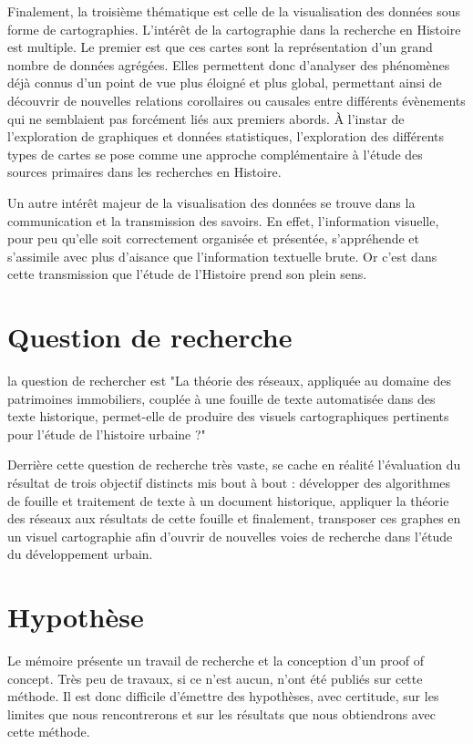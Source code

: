 Finalement, la troisième thématique est celle de la visualisation des données sous forme de cartographies. L’intérêt de la cartographie dans la recherche en Histoire est multiple. Le premier est que ces cartes sont la représentation d’un grand nombre de données agrégées. Elles permettent donc d’analyser des phénomènes déjà connus d’un point de vue plus éloigné et plus global, permettant ainsi de découvrir de nouvelles relations corollaires ou causales entre différents évènements qui ne semblaient pas forcément liés aux premiers abords. À l’instar de l’exploration de graphiques et données statistiques, l’exploration des différents types de cartes se pose comme une approche complémentaire à l’étude des sources primaires dans les recherches en Histoire.

Un autre intérêt majeur de la visualisation des données se trouve dans la communication et la transmission des savoirs. En effet, l’information visuelle, pour peu qu’elle soit correctement organisée et présentée, s’appréhende et s’assimile avec plus d’aisance que l’information textuelle brute. Or c’est dans cette transmission que l’étude de l’Histoire prend son plein sens.

\section{Question de recherche}
 la question de rechercher est "La théorie des réseaux, appliquée au domaine des patrimoines immobiliers, couplée à une fouille de texte automatisée dans des texte historique, permet-elle de produire des visuels cartographiques pertinents pour l’étude de l’histoire urbaine ?"
 
 Derrière cette question de recherche très vaste, se cache en réalité l'évaluation du résultat de trois objectif distincts mis bout à bout : développer des algorithmes de fouille et traitement de texte à un document historique, appliquer la théorie des réseaux aux résultats de cette fouille et finalement, transposer ces graphes en un visuel cartographie afin d'ouvrir de nouvelles voies de recherche dans l'étude du développement urbain.
\section{Hypothèse}
Le mémoire présente un travail de recherche et la conception d'un proof of concept. Très peu de travaux, si ce n'est aucun, n'ont été publiés sur cette méthode. Il est donc  difficile d'émettre des hypothèses, avec certitude,  sur les limites que nous rencontrerons et sur les résultats que nous obtiendrons avec cette méthode.

